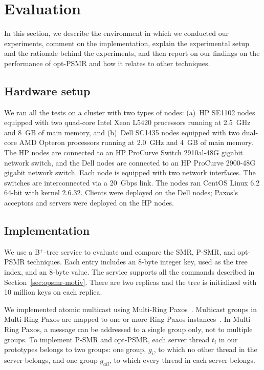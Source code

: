 \documentclass[conference]{IEEEtran}
\begin{document}
\section{Evaluation}
\label{sec:evaluation}

In this section, we describe the environment in which we conducted our experiments, comment on the implementation, explain the experimental setup and the rationale behind the experiments, and then report on our findings on the performance of opt-PSMR and how it relates to other techniques.

\subsection{Hardware setup}

We ran all the tests on a cluster with two types of nodes:
(a)~HP SE1102 nodes equipped with two quad-core Intel Xeon L5420 processors running at 2.5~GHz and 8~GB of main memory, and (b)~Dell SC1435 nodes equipped with two dual-core AMD Opteron processors running at 2.0~GHz and 4~GB of main memory. The HP nodes are connected to an HP ProCurve Switch 2910al-48G gigabit network switch, and the Dell nodes are connected to an HP ProCurve 2900-48G gigabit network switch. Each node is equipped with two network interfaces. The switches are interconnected via a 20~Gbps link. The nodes ran CentOS Linux 6.2 64-bit with kernel 2.6.32. Clients were deployed on the Dell nodes; Paxos's acceptors and servers were deployed on the HP nodes.



\subsection{Implementation}

We use a B$^+$-tree service to evaluate and compare the SMR, P-SMR, and opt-PSMR techniques. 
Each entry includes an 8-byte integer key, used as the tree index, and an 8-byte value. The service supports all the commands described in Section~\ref{sec:opsmr-motiv}. There are two replicas and the tree is initialized with 10 million keys on each replica. 

We implemented atomic multicast using Multi-Ring Paxos~\cite{MPP2012}.
Multicast groups in Multi-Ring Paxos are mapped to one or more Ring Paxos instances~\cite{MPSP2010}.
In Multi-Ring Paxos, a message can be addressed to a single group only, not to multiple groups.
To implement P-SMR and opt-PSMR, each server thread $t_i$ in our prototypes belongs to two groups: one group, $g_i$, to which no other thread in the server belongs, and one group $g_{all}$, to which every thread in each server belongs.
\end{document}
